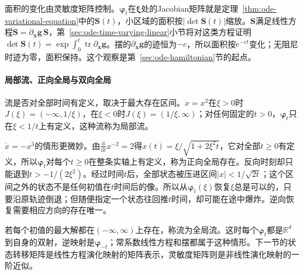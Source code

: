 面积的变化由灵敏度矩阵控制。$\bm\varphi_t$在$\bm\xi$处的Jacobian矩阵就是定理~\ref{thm:ode-variational-equation}中的$\bm S(t)$，小区域的面积按$|\det\bm S(t)|$缩放。$\bm S$满足线性方程$\dot{\bm S}=\partial_{\bm x}\bm g\,\bm S$，第~\ref{sec:ode-time-varying-linear}小节将对这类方程证明$\det\bm S(t)=\exp\int_0^t\operatorname{tr}\partial_{\bm x}\bm g$。摆的$\partial_{\bm x}\bm g$的迹恒为$-c$，所以面积按$e^{-ct}$变化；无阻尼时迹为零，面积保持。这个观察是第~\ref{sec:ode-hamiltonian}节的起点。

\paragraph{局部流、正向全局与双向全局}
流是否对全部时间有定义，取决于最大存在区间。$\dot x=x^2$在$\xi>0$时$J(\xi)=(-\infty,1/\xi)$，在$\xi<0$时$J(\xi)=(1/\xi,\infty)$；对任何固定的$t>0$，$\bm\varphi_t$只在$\xi<1/t$上有定义，这种流称为局部流。

$\dot x=-x^3$的情形更微妙。由$\frac{\mathrm d}{\mathrm dt}x^{-2}=2$得$x(t)=\xi/\sqrt{1+2\xi^2t}$，它对全部$t\geq0$有定义，所以$\bm\varphi_t$对每个$t\geq0$在整条实轴上有定义，称为正向全局存在。反向时刻却只能退到$t>-1/(2\xi^2)$。经过时间$t$后，全部状态被压进区间$|x|<1/\sqrt{2t}$；这个区间之外的状态不是任何初值在$t$时间后的像。所以从$\bm\varphi_t(\xi)$恢复$\xi$总是可以的，只要沿原轨迹倒退；但随便指定一个状态往回推$t$时间，却可能在途中爆炸。逆向恢复需要相应方向的存在唯一。

若每个初值的最大解都在$(-\infty,\infty)$上存在，称流为全局流。这时每个$\bm\varphi_t$都是$\mathbb R^d$到自身的双射，逆映射是$\bm\varphi_{-t}$；常系数线性方程和摆都属于这种情形。下一节的状态转移矩阵是线性方程演化映射的矩阵表示，灵敏度矩阵则是非线性演化映射的一阶近似。
